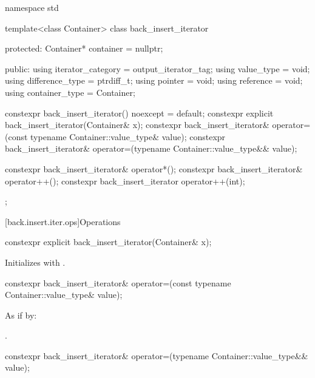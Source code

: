 %
\begin{codeblock}
namespace std {
  template<class Container>
  class back_insert_iterator {
  protected:
    Container* container = nullptr;

  public:
    using iterator_category = output_iterator_tag;
    using value_type        = void;
    using difference_type   = ptrdiff_t;
    using pointer           = void;
    using reference         = void;
    using container_type    = Container;

    constexpr back_insert_iterator() noexcept = default;
    constexpr explicit back_insert_iterator(Container& x);
    constexpr back_insert_iterator& operator=(const typename Container::value_type& value);
    constexpr back_insert_iterator& operator=(typename Container::value_type&& value);

    constexpr back_insert_iterator& operator*();
    constexpr back_insert_iterator& operator++();
    constexpr back_insert_iterator  operator++(int);
  };
}
\end{codeblock}

[back.insert.iter.ops]{Operations}

%
\begin{itemdecl}
constexpr explicit back_insert_iterator(Container& x);
\end{itemdecl}

\begin{itemdescr}
\pnum
\effects
Initializes
with .
\end{itemdescr}

%
\begin{itemdecl}
constexpr back_insert_iterator& operator=(const typename Container::value_type& value);
\end{itemdecl}

\begin{itemdescr}
\pnum
\effects
As if by: 

\pnum
\returns
{}.
\end{itemdescr}

%
\begin{itemdecl}
constexpr back_insert_iterator& operator=(typename Container::value_type&& value);
\end{itemdecl}

